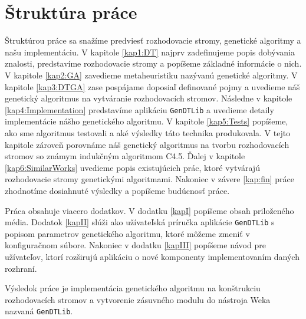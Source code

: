 \section{Štruktúra práce}
Štruktúrou práce sa snažíme predviesť rozhodovacie stromy, genetické algoritmy a našu implementáciu. V kapitole \ref{kap1:DT} najprv zadefinujeme popis dobývania znalosti, predstavíme rozhodovacie stromy a popíšeme základné informácie o nich. V kapitole \ref{kap2:GA} zavedieme metaheuristiku nazývanú genetické algoritmy. V kapitole \ref{kap3:DTGA} zase pospájame doposiaľ definované pojmy a uvedieme náš genetický algoritmus na vytváranie rozhodovacích stromov. Následne v kapitole \ref{kap4:Implementation} predstavíme aplikáciu \verb|GenDTLib| a uvedieme detaily implementácie nášho genetického algoritmu. V kapitole \ref{kap5:Tests} popíšeme, ako sme algoritmus testovali a aké výsledky táto technika produkovala. V tejto kapitole zároveň porovnáme náš genetický algoritmus na tvorbu rozhodovacích stromov so známym indukčným algoritmom C4.5. Ďalej v kapitole \ref{kap6:SimilarWorks} uvedieme popis existujúcich prác, ktoré vytvárajú rozhodovacie stromy genetickými algoritmami. Nakoniec v závere \ref{kap:fin} práce zhodnotíme dosiahnuté výsledky a popíšeme budúcnosť práce.

Práca obsahuje viacero dodatkov. V dodatku \ref{kapI} popíšeme obsah priloženého média. Dodatok \ref{kapII} slúži ako užívateľská príručka aplikácie \verb|GenDTLib| s popisom parametrov genetického algoritmu, ktoré môžeme zmeniť v konfiguračnom súbore. Nakoniec v dodatku \ref{kapIII} popíšeme návod pre užívateľov, ktorí rozširujú aplikáciu o nové komponenty implementovaním daných rozhraní.

Výsledok práce je implementácia genetického algoritmu na konštrukciu rozhodovacích stromov a vytvorenie zásuvného modulu do nástroja Weka nazvaná \verb|GenDTLib|.